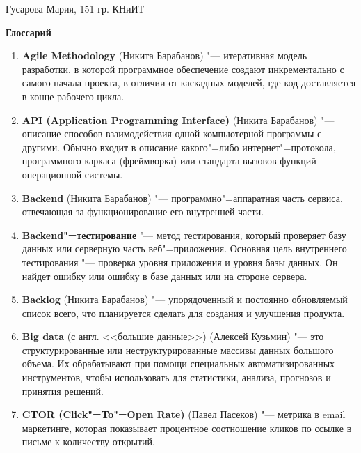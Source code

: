 \documentclass[12pt]{article}
\begin{document}
\begin{flushright}
    Гусарова Мария, 151 гр. КНиИТ
\end{flushright}

\begin{center}
    \textbf{\Large{Глоссарий}}
\end{center}

\begin{enumerate}
    \item \textbf{Agile Methodology} (Никита Барабанов) "--- итеративная модель разработки, в которой программное обеспечение создают инкрементально с самого начала проекта, в отличии от каскадных моделей, где код доставляется в конце рабочего цикла.
    
    \item \textbf{API (Application Programming Interface)} (Никита Барабанов) "--- описание способов взаимодействия одной компьютерной программы с другими. Обычно входит в описание какого"=либо интернет"=протокола, программного каркаса (фреймворка) или стандарта вызовов функций операционной системы.

    \item \textbf{Backend} (Никита Барабанов) "--- программно"=аппаратная часть сервиса, отвечающая за функционирование его внутренней части.

    \item \textbf{Backend"=тестирование} "--- метод тестирования, который проверяет базу данных или серверную часть веб"=приложения. Основная цель внутреннего тестирования "--- проверка уровня приложения и уровня базы данных. Он найдет ошибку или ошибку в базе данных или на стороне сервера.

    \item \textbf{Backlog} (Никита Барабанов) "--- упорядоченный и постоянно обновляемый список всего, что планируется сделать для создания и улучшения продукта.

    \item \textbf{Big data} (с англ. <<большие данные>>) (Алексей Кузьмин) "--- это структурированные или неструктурированные массивы данных большого объема. Их обрабатывают при помощи специальных автоматизированных инструментов, чтобы использовать для статистики, анализа, прогнозов и принятия решений.

    \item \textbf{CTOR (Click"=To"=Open Rate)} (Павел Пасеков) "--- метрика в email маркетинге, которая показывает процентное соотношение кликов по ссылке в письме к количеству открытий.


\end{enumerate}
\end{document}

